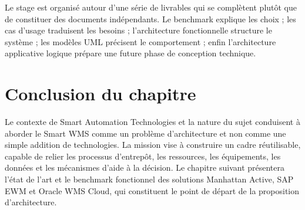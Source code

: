 \label{sec:1.9}

Le stage est organisé autour d’une série de livrables qui se complètent plutôt que de constituer des documents indépendants. Le benchmark explique les choix ; les cas d’usage traduisent les besoins ; l’architecture fonctionnelle structure le système ; les modèles UML précisent le comportement ; enfin l’architecture applicative logique prépare une future phase de conception technique.





\section{Conclusion du chapitre}

\label{sec:1.10}

Le contexte de Smart Automation Technologies et la nature du sujet conduisent à aborder le Smart WMS comme un problème d’architecture et non comme une simple addition de technologies. La mission vise à construire un cadre réutilisable, capable de relier les processus d’entrepôt, les ressources, les équipements, les données et les mécanismes d’aide à la décision. Le chapitre suivant présentera l’état de l’art et le benchmark fonctionnel des solutions Manhattan Active, SAP EWM et Oracle WMS Cloud, qui constituent le point de départ de la proposition d’architecture.

